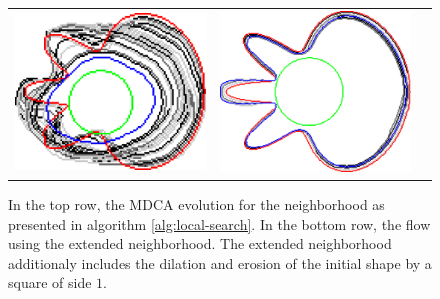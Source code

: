 \begin{figure}
\begin{tabular}{ccc}
\includegraphics[scale=0.25]{figures/chapter5/mdca-larger-neighborhood/flower/0.01/0.5/summary.pdf} &
\includegraphics[scale=0.25]{figures/chapter5/mdca-larger-neighborhood/flower/0.01/0.25/summary.pdf}
\end{tabular}
\caption{In the top row, the MDCA evolution for the neighborhood as presented in algorithm \ref{alg:local-search}. In the bottom row, the flow using the extended neighborhood. The extended neighborhood additionaly includes the dilation and erosion of the initial shape by a square of side $1$.}
\label{fig:mdca-larger-neighborhood}
\end{figure}


